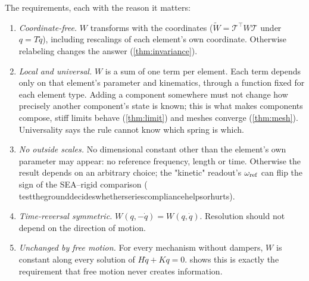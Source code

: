 \documentclass[11pt]{article}
\theoremstyle{definition}
\theoremstyle{remark}
\newcommand{\codeus}{\textunderscore\allowbreak}
\newcommand{\code}[1]{{\ttfamily\let\_\codeus\hyphenchar\font=-1 #1}}
\begin{document}
The requirements, each with the reason it matters:
\begin{enumerate}[label=(U\arabic*)]
  \item \emph{Coordinate-free.} $W$ transforms with the coordinates
        ($\tilde W=\mathcal T^\top W\mathcal T$ under $q=T\tilde q$), including rescalings of
        each element's own coordinate. Otherwise relabeling changes the answer
        (\cref{thm:invariance}).
  \item \emph{Local and universal.} $W$ is a sum of one term per element. Each term depends
        only on that element's parameter and kinematics, through a function fixed for each
        element type. Adding a component somewhere must not change how precisely another
        component's state is known; this is what makes components compose, stiff limits
        behave (\cref{thm:limit}) and meshes converge (\cref{thm:mesh}). Universality says
        the rule cannot know which spring is which.
  \item \emph{No outside scales.} No dimensional constant other than the element's own
        parameter may appear: no reference frequency, length or time. Otherwise the result
        depends on an arbitrary choice; the \code{"kinetic"} readout's $\omega_{\rm ref}$
        can flip the sign of the SEA--rigid comparison
        (\code{test\_the\_ground\_decides\_whether\_series\_compliance\_helps\_or\_hurts}).
  \item \emph{Time-reversal symmetric.} $W(q,-\dot q)=W(q,\dot q)$. Resolution should not
        depend on the direction of motion.
  \item \emph{Unchanged by free motion.} For every mechanism without dampers, $W$ is
        constant along every solution of $H\ddot q+Kq=0$.  shows this is
        exactly the requirement that free motion never creates information.
\end{enumerate}
\end{document}

